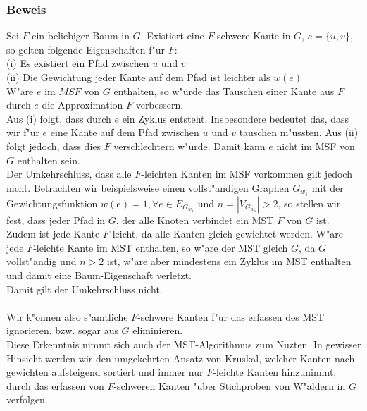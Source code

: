 \subsubsection{Beweis}
Sei $F$ ein beliebiger Baum in $G$.
    Existiert eine $F$ schwere Kante in $G$, $e=\{u, v\}$, so gelten folgende 
    Eigenschaften f"ur $F$:\\
(i) Es existiert ein Pfad zwischen $u$ und $v$\\
(ii) Die Gewichtung jeder Kante auf dem Pfad ist leichter als $w(e)$\\
W"are $e$ im $MSF$ von $G$ enthalten, so w"urde das Tauschen einer Kante aus
    $F$ durch $e$ die Approximation $F$ verbessern.\\
Aus (i) folgt, dass durch $e$ ein Zyklus entsteht. Insbesondere bedeutet das, 
    dass wir f"ur $e$ eine Kante auf dem Pfad zwischen $u$ und $v$ tauschen
    m"ussten.
    Aus (ii) folgt jedoch, dass dies $F$ verschlechtern w"urde.
    Damit kann $e$ nicht im MSF von $G$ enthalten sein.\\
Der Umkehrschluss, dass alle $F$-leichten Kanten im MSF vorkommen gilt jedoch
    nicht.
    Betrachten wir beispielsweise einen vollst"andigen Graphen $G_{w_1}$ mit der 
    Gewichtungsfunktion $w(e) = 1, \forall e \in E_{G_{w_1}}$ und 
    $n = |V_{G_{w_1}}| > 2$, so stellen wir fest, dass jeder Pfad in $G$, der alle
    Knoten verbindet ein MST $F$ von $G$ ist.
    Zudem ist jede Kante $F$-leicht, da alle Kanten gleich gewichtet werden.
    W"are jede $F$-leichte Kante im MST enthalten, so w"are der MST gleich $G$,
    da $G$ vollst"andig und $n > 2$ ist, w"are aber mindestens ein Zyklus im 
    MST enthalten und damit eine Baum-Eigenschaft verletzt.\\
    Damit gilt der Umkehrschluss nicht.\\
\\
Wir k"onnen also s"amtliche $F$-schwere Kanten f"ur das erfassen des MST 
    ignorieren, bzw. sogar aus $G$ eliminieren.\\
Diese Erkenntnis nimmt sich auch der MST-Algorithmus zum Nuzten. In gewisser
    Hinsicht werden wir den umgekehrten Ansatz von Kruskal, welcher Kanten nach
    gewichten aufsteigend sortiert und immer nur $F$-leichte Kanten hinzunimmt,
    durch das erfassen von $F$-schweren Kanten "uber Stichproben von W"aldern
    in $G$ verfolgen.\\

